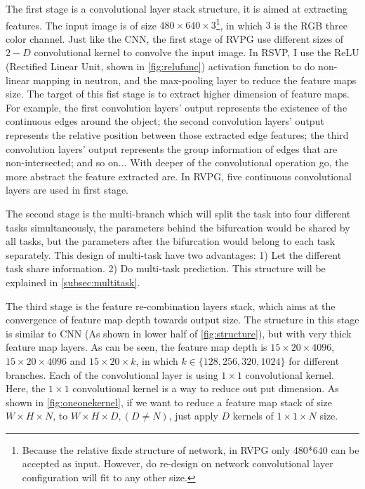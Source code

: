 \begin{spacing}{1.5}
The first stage is a convolutional layer stack structure, it is aimed at extracting features. The input image is of size $480 \times 640 \times 3$\footnote{Because the relative fixde structure of network, in RVPG only 480*640 can be accepted as input. However, do re-design on network convolutional layer configuration will fit to any other size.}, in which $3$ is the RGB three color channel. Just like the CNN, the first stage of RVPG use different sizes of $2-D$ convolutional kernel to convolve the input image. In RSVP, I use the ReLU (Rectified Linear Unit, shown in \autoref{fig:relufunc}) activation function to do non-linear mapping in neutron, and the max-pooling layer to reduce the feature maps size. The target of this fist stage is to extract higher dimension of feature maps. For example, the first convolution layers' output represents the existence of the continuous edges around the object; the second convolution layers' output represents the relative position between those extracted edge features; the third convolution layers' output represents the group information of edges that are non-intersected; and so on... With deeper of the convolutional operation go, the more abstract the feature extracted are. In RVPG, five continuous convolutional layers are used in first stage.

The second stage is the multi-branch which will split the task into four different tasks simultaneously, the parameters behind the bifurcation would be shared by all tasks, but the parameters after the bifurcation would belong to each task separately. This design of multi-task have two advantages: 1) Let the different task share information. 2) Do multi-task prediction. This structure will be explained in \autoref{subsec:multitask}.

The third stage is the feature re-combination layers stack, which aims at the convergence of feature map depth towards output size. The structure in this stage is similar to CNN (As shown in lower half of \autoref{fig:structure}), but with very thick feature map layers. As can be seen, the feature map depth is $15 \times 20 \times 4096$, $15 \times 20 \times 4096$ and $15 \times 20 \times k$, in which $k \in \{128, 256, 320, 1024\}$ for different branches. Each of the convolutional layer is using $1 \times 1$ convolutional kernel. Here, the $1 \times 1$ convolutional kernel is a way to reduce out put dimension. As shown in \autoref{fig:oneonekernel}, if we want to reduce a feature map stack of size $W \times H \times N$, to $W \times H \times D, (D \neq N)$, just apply $D$ kernels of $1 \times 1 \times N$ size.


\end{spacing}
